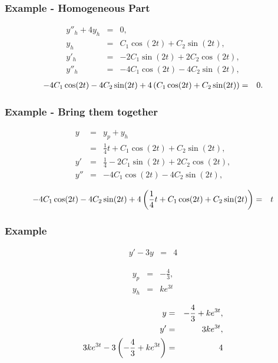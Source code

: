\begin{frame}
  \frametitle{Example - Homogeneous Part}

  \begin{eqnarray*}
    y''_h + 4y_h & = & 0, \\
    y_h & = & C_1 \cos(2t) + C_2 \sin(2t), \\
    y'_h & = & -2 C_1 \sin(2t) + 2 C_2 \cos(2t), \\
    y''_h & = & -4 C_1 \cos(2t) - 4 C_2 \sin(2t), 
  \end{eqnarray*}
  \begin{eqnarray*}
    -4 C_1 \cos(2t) - 4 C_2 \sin(2t) + 4\left( C_1 \cos(2t) + C_2 \sin(2t) \right) & = & 0.
  \end{eqnarray*}

\end{frame}


\begin{frame}
  \frametitle{Example - Bring them together}

  \begin{eqnarray*}
    y & = & y_p + y_h \\
    & = & \frac{1}{4} t + C_1 \cos(2t) + C_2 \sin(2t), \\
    y' & = & \frac{1}{4}  - 2 C_1 \sin(2t) + 2 C_2 \cos(2t), \\
    y'' & = & - 4 C_1 \cos(2t) - 4 C_2 \sin(2t),
  \end{eqnarray*}

  \begin{eqnarray*}
    - 4 C_1 \cos(2t) - 4 C_2 \sin(2t) + 4 \left( \frac{1}{4} t + C_1 \cos(2t) + C_2 \sin(2t) \right) & = & t
  \end{eqnarray*}

\end{frame}


\begin{frame}
  \frametitle{Example}

  \begin{eqnarray*}
    y' - 3y & = & 4
  \end{eqnarray*}

  \begin{eqnarray*}
    y_p & = & -\frac{4}{3}, \\
    y_h & = & k e^{3t}
  \end{eqnarray*}

  \begin{eqnarray*}
    y & = & -\frac{4}{3} + k e^{3t}, \\
    y' & = & 3 k e^{3t}, \\
    3 k e^{3t} - 3 \left( -\frac{4}{3} + k e^{3t} \right) & = & 4
  \end{eqnarray*}


\end{frame}


